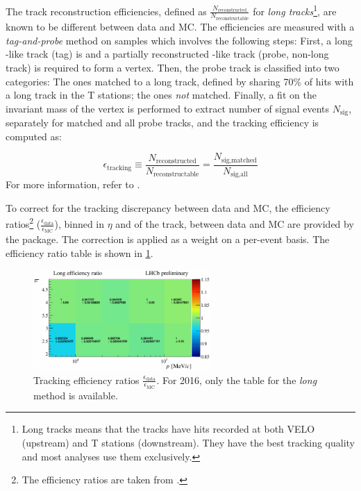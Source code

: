 The track reconstruction efficiencies,
defined as $\frac{N_\text{reconstructed}}{N_\text{reconstructable}}$ for
\emph{long tracks}\footnote{
    Long tracks means that the tracks have hits recorded at both VELO (upstream)
    and T stations (downstream).
    They have the best tracking quality and most analyses use them exclusively.
},
are known to be different between data and MC.
The efficiencies are measured with a \emph{tag-and-probe} method on
\jpsi\mup\mun samples
which involves the following steps:
First, a long \muon-like track (tag) is and a partially reconstructed \muon-like
track (probe, non-long track) is required to form a \mun\mup vertex.
Then, the probe track is classified into two categories: The ones matched to a
long track, defined by sharing 70\% of hits with a long track in the T stations;
the ones \emph{not} matched.
Finally, a fit on the invariant mass of the \mun\mup vertex is performed to
extract number of signal events $N_\text{sig}$,
separately for matched and all probe tracks,
and the tracking efficiency is computed as:

\begin{equation}
    \epsilon_\text{tracking} \equiv
        \frac{N_\text{reconstructed}}{N_\text{reconstructable}}
        = \frac{N_\text{sig,matched}}{N_\text{sig,all}}
\end{equation}
For more information, refer to \cite{LHCb-PUB-2011-025,LHCb-DP-2013-002}.

To correct for the tracking discrepancy between data and MC,
the efficiency ratios\footnote{
    The efficiency ratios are taken from
    .
}
($\frac{\epsilon_\text{data}}{\epsilon_\text{MC}}$),
binned in $\eta$ and \ptot of the track,
between data and MC are provided by the \trackcalib package.
The correction is applied as a weight on a per-event basis.
The efficiency ratio table is shown in \cref{fig:trackcalib-eff}.

\begin{figure}[htb]
    \centering
    \includegraphics[width=0.6\textwidth]{./figs-mc-correction/reweighting-tracking/tracking_eff_2016.pdf}
    \caption{
        Tracking efficiency ratios
        $\frac{\epsilon_\text{data}}{\epsilon_\text{MC}}$.
        For 2016, only the table for the \emph{long} method is available.
    }
    \label{fig:trackcalib-eff}
\end{figure}

